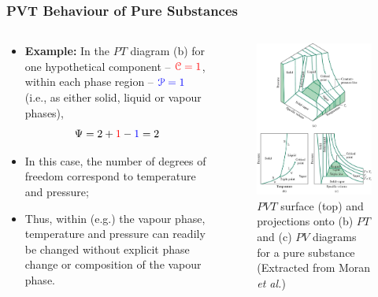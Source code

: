 \documentclass[10pt,compress]{beamer}
\begin{document}
\begin{frame}
 \frametitle{PVT Behaviour of Pure Substances}
 \begin{columns}
  \begin{column}[l]{0.5\linewidth}
\begin{itemize}
\item <1-> {\bf Example:} In the $PT$ diagram (b) for one hypothetical component -- $\textcolor{red}{\mathcal{C}=1}$, within each phase region -- $\textcolor{blue}{\mathcal{P}=1}$ (i.e., as either solid, liquid or vapour phases),
\begin{displaymath}
\Psi = 2 + \textcolor{red}{1} - \textcolor{blue}{1} = 2
\end{displaymath}
\item <2-> In this case, the number of degrees of freedom correspond to temperature and pressure;
\item <3-> Thus, within (e.g.) the vapour phase, temperature and pressure can readily be changed without explicit phase change or composition of the vapour phase.
\end{itemize}
  \end{column}
  \begin{column}[l]{0.5\linewidth}
   \begin{figure}%
    \begin{center}
     \includegraphics[width=4.cm,clip]{./Pics/PVT_Surface.jpg}
    \end{center}
\caption{$PVT$ surface (top) and projections onto (b) $PT$ and (c) $PV$ diagrams for a pure substance (Extracted from Moran {\it et al.})}
   \end{figure}    
  \end{column}
 \end{columns}
\end{frame}
\end{document}
